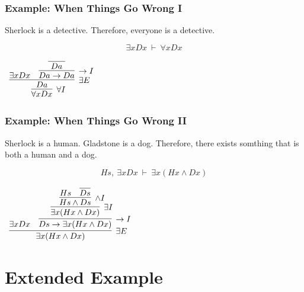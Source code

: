 \documentclass{beamer}
\theoremstyle{indentDefn} \newtheorem{defn}[]{Definition}
\begin{document}
\begin{frame}
	\frametitle{Example: When Things Go Wrong I}
	
	Sherlock is a detective. Therefore, everyone is a detective. 
	
	\vspace{0.5cm}
	
	$$ \exists x Dx \ \vdash \ \forall x Dx $$
	
	\vspace{0.5cm}
	
	\begin{center}
		$\begin{array}{c}
			\infer[\forall I]{\forall x Dx}{\infer[\exists E]{Da}
					{\exists x Dx & \infer[\rightarrow I]{Da \rightarrow Da}{\infer[]{ \ Da \ }{}}
				}
			}
		
		 \end{array}$
	\end{center}

	
\end{frame}
	
\begin{frame}
	\frametitle{Example: When Things Go Wrong II}
	
	Sherlock is a human. Gladstone is a dog. Therefore, there exists somthing that is both a human and a dog. 
	
	\vspace{0.5cm}
	
	$$ Hs, \ \exists x Dx \ \vdash \ \exists x (Hx \land Dx) $$
	
	\vspace{0.5cm}
	
	\begin{center}
		$\begin{array}{c}
	
			\infer[\exists E]{\exists x (Hx \land Dx)}{\exists x Dx & \infer[\rightarrow I]{Ds \rightarrow \exists x (Hx \land Dx)}
				{\infer[\exists I]{\exists x (Hx \land Dx)}
					{\infer[\land I]{Hs \land Ds}
						{Hs & \infer[]{Ds}
							{}}}}}


	     \end{array}$
	\end{center}
\end{frame}

\section{Extended Example}
\end{document}
